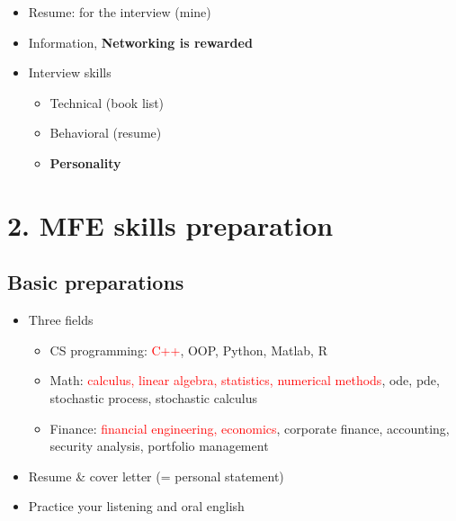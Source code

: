 \documentclass[
paper=128mm:96mm, %
fontsize=11pt, %
pagesize, %
parskip=half-, %
]{scrartcl} %
\theoremstyle{mythmstyle} %
\begin{document}
\clearpage



\begin{itemize}
\item Resume: for the interview (mine)
\item Information, \textbf{Networking is rewarded}
\item Interview skills
\begin{itemize}
	\item Technical (book list)
	\item Behavioral (resume)
	\item \textbf{Personality}
\end{itemize}
\end{itemize}

\clearpage



\section{2. MFE skills preparation}

\clearpage


\subsection{Basic preparations}

\begin{itemize}
\item Three fields
	\begin{itemize}
		\item CS programming: \textcolor{red}{C++}, OOP, Python, Matlab, R
		\item Math: \textcolor{red}{calculus, linear algebra, statistics, numerical methods}, ode, pde, stochastic process, stochastic calculus
		\item Finance: \textcolor{red}{financial engineering, economics}, corporate finance, accounting, security analysis, portfolio management
	\end{itemize}
\item Resume \& cover letter (= personal statement)
\item Practice your listening and oral english
\end{itemize}
\end{document}
